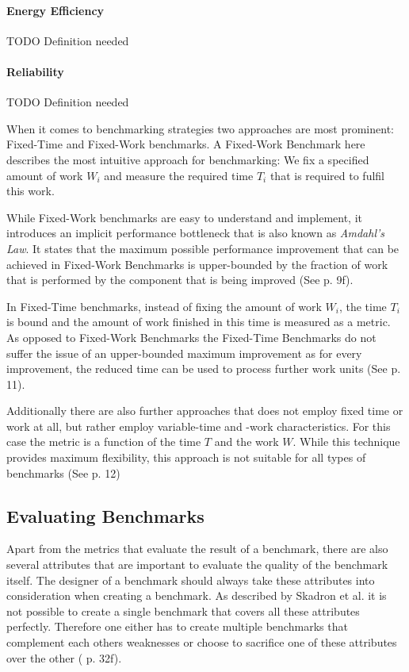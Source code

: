 \documentclass[	runningheads,
				a4paper]{llncs}
\begin{document}
\paragraph{Energy Efficiency} TODO Definition needed

\paragraph{Reliability} TODO Definition needed

When it comes to benchmarking strategies two approaches are most prominent: Fixed-Time and Fixed-Work benchmarks. A Fixed-Work Benchmark here describes the most intuitive approach for benchmarking: We fix a specified amount of work $W_i$ and measure the required time $T_i$ that is required to fulfil this work.

While Fixed-Work benchmarks are easy to understand and implement, it introduces an implicit performance bottleneck that is also known as \textit{Amdahl's Law}. It states that the maximum possible performance improvement that can be achieved in Fixed-Work Benchmarks is upper-bounded by the fraction of work that is performed by the component that is being improved (See \cite{Kounev} p. 9f).

In Fixed-Time benchmarks, instead of fixing the amount of work $W_i$, the time $T_i$ is bound and the amount of work finished in this time is measured as a metric. As opposed to Fixed-Work Benchmarks the Fixed-Time Benchmarks do not suffer the issue of an upper-bounded maximum improvement as for every improvement, the reduced time can be used to process further work units (See \cite{Kounev} p. 11).

Additionally there are also further approaches that does not employ fixed time or work at all, but rather employ variable-time and -work characteristics. For this case the metric is a function of the time $T$ and the work $W$. While this technique provides maximum flexibility, this approach is not suitable for all types of benchmarks (See \cite{Kounev} p. 12)

\subsection{Evaluating Benchmarks}
\label{ssec:eval_bm}
Apart from the metrics that evaluate the result of a benchmark, there are also several attributes that are important to evaluate the quality of the benchmark itself. The designer of a benchmark should always take these attributes into consideration when creating a benchmark. As described by Skadron et al. it is not possible to create a single benchmark that covers all these attributes perfectly. Therefore one either has to create multiple benchmarks that complement each others weaknesses or choose to sacrifice one of these attributes over the other (\cite{Skadron2003} p. 32f).
\end{document}
